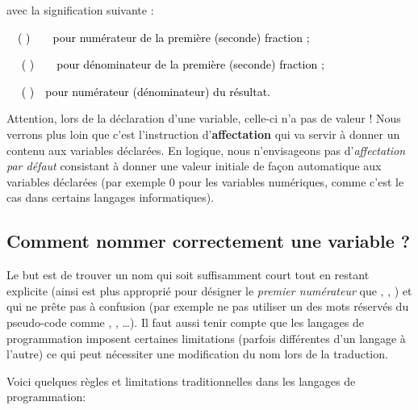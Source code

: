 			avec la signification suivante :

			{
			\ \ \textstyleCodeInsr{\textcolor{black}{num1 }}\textcolor{black}{(
			}\textstyleCodeInsr{\textcolor{black}{num2}}\textcolor{black}{
			)}\textcolor{black}{\ \ \ \ pour numérateur de la première (seconde)
			fraction ;}}
			
			{
			\textcolor{black}{\ \ }\textstyleCodeInsr{\textcolor{black}{den1}}\textcolor{black}{
			( }\textstyleCodeInsr{\textcolor{black}{den2}}\textcolor{black}{
			)}\textcolor{black}{\ \ \ \ pour dénominateur de la première (seconde)
			fraction ;}}
			
			{
			\textcolor{black}{\ \ }\textstyleCodeInsr{\textcolor{black}{numRes}}\textcolor{black}{
			( }\textstyleCodeInsr{\textcolor{black}{denRes
			}}\textcolor{black}{)}\textcolor{black}{\ \ pour numérateur
			(dénominateur) du résultat.}}

			Attention, lors de la déclaration d’une variable, celle-ci n’a pas de
			valeur ! Nous verrons plus loin que c’est l’instruction
			d’\textbf{affectation} qui va servir à donner un contenu aux variables
			déclarées. En logique, nous n’envisageons pas d’\textit{affectation par
			défaut} consistant à donner une valeur initiale de façon automatique
			aux variables déclarées (par exemple 0 pour les variables numériques,
			comme c’est le cas dans certains langages informatiques).

		\subsection{Comment nommer correctement une variable ?}

			Le but est de trouver un nom qui soit suffisamment court tout en restant
			explicite (ainsi  est plus approprié pour
			désigner le \textit{premier numérateur }que ,
			, ) et qui ne prête pas à confusion (par exemple ne pas
			utiliser un des mots réservés du pseudo-code comme
			, ,
			…). Il faut aussi tenir compte que les
			langages de programmation imposent certaines limitations (parfois
			différentes d'un langage à l'autre)
			ce qui peut nécessiter une modification du nom lors de la traduction.

			Voici quelques règles et limitations traditionnelles dans les langages
			de programmation:

